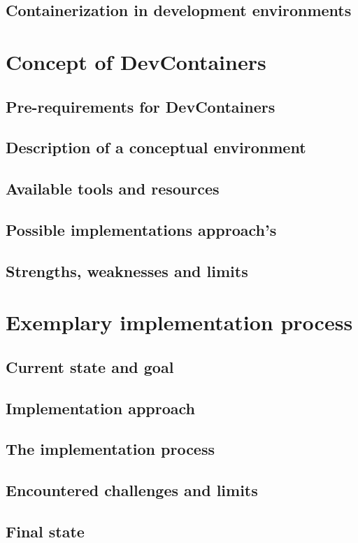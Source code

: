\documentclass[12pt, a4paper]{article}
\begin{document}
    \subsection{Containerization in development environments}
\section{Concept of DevContainers}
    \subsection{Pre-requirements for DevContainers}
    \subsection{Description of a conceptual environment}
    \subsection{Available tools and resources}
    \subsection{Possible implementations approach's}
    \subsection{Strengths, weaknesses and limits}
\section{Exemplary implementation process}
    \subsection{Current state and goal}
    \subsection{Implementation approach}
    \subsection{The implementation process}
    \subsection{Encountered challenges and limits}
    \subsection{Final state}
\end{document}
